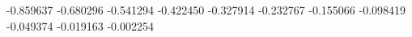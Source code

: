 -0.859637
-0.680296
-0.541294
-0.422450
-0.327914
-0.232767
-0.155066
-0.098419
-0.049374
-0.019163
-0.002254
